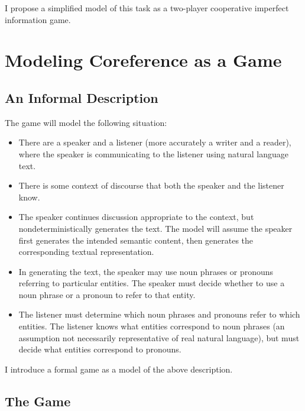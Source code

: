 \documentclass[11pt]{article}
\begin{document}
    I propose a simplified model of this task as a two-player cooperative imperfect information game.


    \section{Modeling Coreference as a Game}\label{sec:modeling-coreference-as-a-game}

    \subsection{An Informal Description}\label{subsec:an-informal-description}

    The game will model the following situation:
    \begin{itemize}
        \item
        There are a speaker and a listener (more accurately a writer and a reader),
        where the speaker is communicating to the listener using natural language text.
        \item
        There is some context of discourse that both the speaker and the listener know.
        \item
        The speaker continues discussion appropriate to the context,
        but nondeterministically generates the text.
        The model will assume the speaker first generates the intended semantic content,
        then generates the corresponding textual representation.
        \item
        In generating the text, the speaker may use noun phrases or pronouns
        referring to particular entities.
        The speaker must decide whether to use a noun phrase or a pronoun to refer to that entity.
        \item
        The listener must determine which noun phrases and pronouns refer to which entities.
        The listener knows what entities correspond to noun phrases
        (an assumption not necessarily representative of real natural language),
        but must decide what entities correspond to pronouns.
    \end{itemize}

    I introduce a formal game as a model of the above description.

    \subsection{The Game}\label{subsec:the-game}
\end{document}
